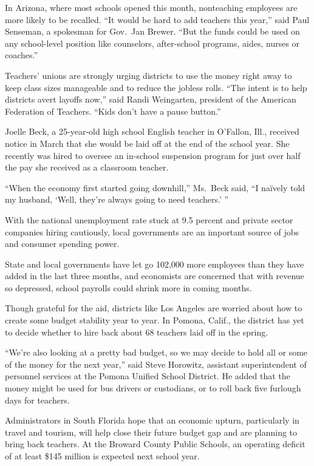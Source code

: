 ﻿\documentclass[12pt]{article}
\begin{document}
In Arizona, where most schools opened this month, nonteaching employees are more likely to be
recalled. ``It would be hard to add teachers this year,'' said Paul Senseman, a spokesman for
Gov.~Jan Brewer. ``But the funds could be used on any school-level position like counselors,
after-school programs, aides, nurses or coaches.''

Teachers' unions are strongly urging districts to use the money right away to keep class sizes
manageable and to reduce the jobless rolls. ``The intent is to help districts avert layoffs now,''
said Randi Weingarten, president of the American Federation of Teachers. ``Kids don't have a pause
button.''

Joelle Beck, a 25-year-old high school English teacher in O'Fallon, Ill., received notice in March
that she would be laid off at the end of the school year. She recently was hired to oversee an
in-school suspension program for just over half the pay she received as a classroom teacher.

``When the economy first started going downhill,'' Ms.~Beck said, ``I na\"ively told my husband,
`Well, they're always going to need teachers.' ''

With the national unemployment rate stuck at 9.5 percent and private sector companies hiring
cautiously, local governments are an important source of jobs and consumer spending power.

State and local governments have let go 102,000 more employees than they have added in the last
three months, and economists are concerned that with revenue so depressed, school payrolls could
shrink more in coming months.

Though grateful for the aid, districts like Los Angeles are worried about how to create some budget
stability year to year. In Pomona, Calif., the district has yet to decide whether to hire back about
68 teachers laid off in the spring.

``We're also looking at a pretty bad budget, so we may decide to hold all or some of the money for
the next year,'' said Steve Horowitz, assistant superintendent of personnel services at the Pomona
Unified School District. He added that the money might be used for bus drivers or custodians, or to
roll back five furlough days for teachers.

Administrators in South Florida hope that an economic upturn, particularly in travel and tourism,
will help close their future budget gap and are planning to bring back teachers. At the Broward
County Public Schools, an operating deficit of at least \$145 million is expected next school year.
\end{document}
